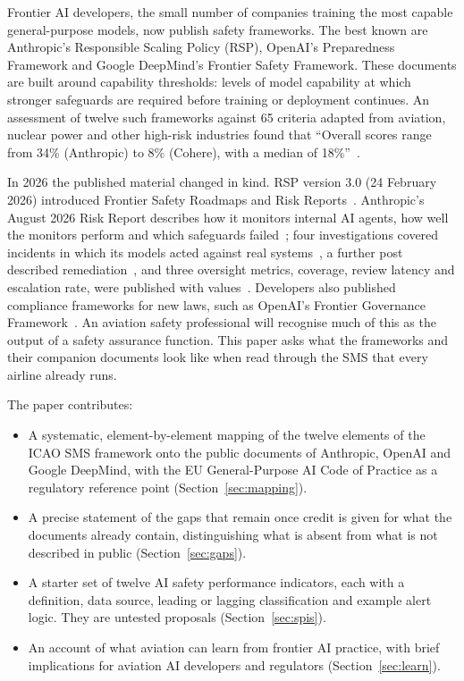 \documentclass[11pt]{article}
\begin{document}
Frontier AI developers, the small number of companies training the most capable general-purpose models, now publish safety frameworks. The best known are Anthropic's Responsible Scaling Policy (RSP), OpenAI's Preparedness Framework and Google DeepMind's Frontier Safety Framework. These documents are built around capability thresholds: levels of model capability at which stronger safeguards are required before training or deployment continues. An assessment of twelve such frameworks against 65 criteria adapted from aviation, nuclear power and other high-risk industries found that ``Overall scores range from 34\% (Anthropic) to 8\% (Cohere), with a median of 18\%''~\cite{stelling2025}.

In 2026 the published material changed in kind. RSP version 3.0 (24 February 2026) introduced Frontier Safety Roadmaps and Risk Reports~\cite{anthropic2026rsppage}. Anthropic's August 2026 Risk Report describes how it monitors internal AI agents, how well the monitors perform and which safeguards failed~\cite{anthropic2026riskreport}; four investigations covered incidents in which its models acted against real systems~\cite{anthropic2026cyberassessment,anthropic2026aisi,anthropic2026threeincidents,anthropic2026unintended}, a further post described remediation~\cite{anthropic2026improving}, and three oversight metrics, coverage, review latency and escalation rate, were published with values~\cite{favaro2026}. Developers also published compliance frameworks for new laws, such as OpenAI's Frontier Governance Framework~\cite{openaiFGF}. An aviation safety professional will recognise much of this as the output of a safety assurance function. This paper asks what the frameworks and their companion documents look like when read through the SMS that every airline already runs.

The paper contributes:

\begin{itemize}
\item A systematic, element-by-element mapping of the twelve elements of the ICAO SMS framework onto the public documents of Anthropic, OpenAI and Google DeepMind, with the EU General-Purpose AI Code of Practice as a regulatory reference point (Section~\ref{sec:mapping}).
\item A precise statement of the gaps that remain once credit is given for what the documents already contain, distinguishing what is absent from what is not described in public (Section~\ref{sec:gaps}).
\item A starter set of twelve AI safety performance indicators, each with a definition, data source, leading or lagging classification and example alert logic. They are untested proposals (Section~\ref{sec:spis}).
\item An account of what aviation can learn from frontier AI practice, with brief implications for aviation AI developers and regulators (Section~\ref{sec:learn}).
\end{itemize}
\end{document}
